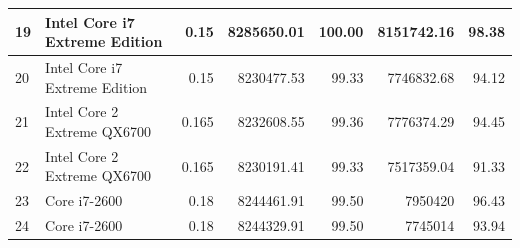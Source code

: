 \begin{table}[h]
{\begin{tabular}{|l|l|r|r|r|r|r|}
19	&	Intel Core i7 Extreme Edition	&	0.15	&	8285650.01	&	100.00	&	8151742.16	&	98.38	\\	\hline
20	&	Intel Core i7 Extreme Edition	&	0.15	&	8230477.53	&	99.33	&	7746832.68	&	94.12	\\	\hline
21	&	Intel Core 2 Extreme QX6700	&	0.165	&	8232608.55	&	99.36	&	7776374.29	&	94.45	\\	\hline
22	&	Intel Core 2 Extreme QX6700	&	0.165	&	8230191.41	&	99.33	&	7517359.04	&	91.33	\\	\hline
23	&	Core i7-2600	&	0.18	&	8244461.91	&	99.50	&	7950420	&	96.43	\\	\hline
24	&	Core i7-2600	&	0.18	&	8244329.91	&	99.50	&	7745014	&	93.94	\\	\hline
\end{tabular}
}
\label{case5sha24}
\end{table}

